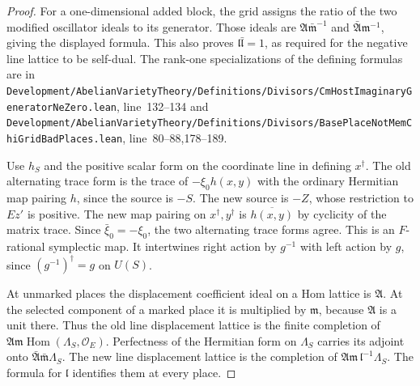 \documentclass[a4paper,11pt]{article}
\theoremstyle{definition}
\theoremstyle{remark}
\newcommand{\srcloc}[2]{{\small\nolinkurl{#1.lean}}, line~#2}
\numberwithin{equation}{section}
\begin{document}
\begin{proof}
For a one-dimensional added block, the grid assigns the ratio
of the two modified oscillator ideals to its generator. Those
ideals are \(\mathfrak A\bar{\mathfrak m}^{-1}\) and
\(\bar{\mathfrak A}\mathfrak m^{-1}\), giving the displayed
formula. This also proves \(\mathfrak l\bar{\mathfrak l}=1\),
as required for the negative line lattice to be self-dual.
The rank-one specializations of the defining formulas are in
\srcloc{Development/AbelianVarietyTheory/Definitions/Divisors/CmHostImaginaryGeneratorNeZero}{132--134}
and \srcloc{Development/AbelianVarietyTheory/Definitions/Divisors/BasePlaceNotMemChiGridBadPlaces}{80--88,178--189}.

Use \(h_S\) and the positive scalar form on the coordinate line
in defining \(x^\dagger\). The old alternating trace form is
the trace of \(-\xi_0 h(x,y)\) with the ordinary Hermitian map
pairing \(h\), since the source is \(-S\). The new source is
\(-Z\), whose restriction to \(Ez'\) is positive. The new map
pairing on \(x^\dagger,y^\dagger\) is \(\overline{h(x,y)}\)
by cyclicity of the matrix trace. Since \(\bar\xi_0=-\xi_0\),
the two alternating trace forms agree. This is an \(F\)-rational
symplectic map. It intertwines right action by \(g^{-1}\) with
left action by \(g\), since \((g^{-1})^\dagger=g\) on \(U(S)\).

At unmarked places the displacement coefficient ideal on a
Hom lattice is \(\mathfrak A\). At the selected component of
a marked place it is multiplied by \(\mathfrak m\), because
\(\mathfrak A\) is a unit there. Thus the old line displacement
lattice is the finite completion of
\(\mathfrak A\mathfrak m\operatorname{Hom}(\Lambda_S,\mathcal O_E)\).
Perfectness of the Hermitian form on \(\Lambda_S\) carries its
adjoint onto \(\bar{\mathfrak A}\bar{\mathfrak m}\Lambda_S\).
The new line displacement lattice is the completion of
\(\mathfrak A\mathfrak m\,\mathfrak l^{-1}\Lambda_S\).
The formula for \(\mathfrak l\) identifies them at every place.


\end{proof}
\end{document}
